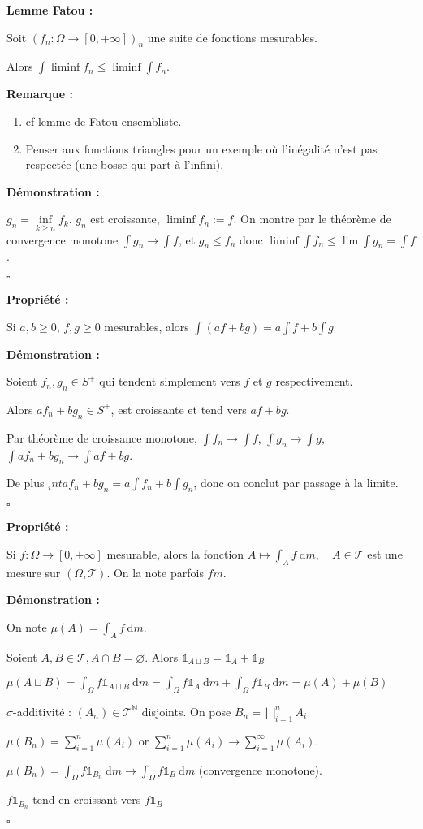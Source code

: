 \documentclass[10pt,a4paper,notitlepage ]{report}
\newcommand{\N}{\mathbb N}
\newcommand{\T}{\mathcal T}
\newcommand{\dd}{\ \mathrm d}
\newcommand{\1}{\mathds 1}
\newcounter{th}
\newenvironment{propriete}[1][]{
	\begin{tcolorbox}
		\textbf{Propriété #1 : }
}
{\end{tcolorbox}}
\newenvironment{demo}[1][]{

	\textbf{Démonstration #1 :}
}{\begin{flushright}
	$\square$
\end{flushright}
}
\newenvironment{lemme}[1][]{
	\begin{tcolorbox}
		\textbf{Lemme #1 : }
	}
	{\end{tcolorbox}}
\newenvironment{rem}{
	
		\textbf{Remarque :}}{}
\begin{document}
\begin{lemme}[Fatou]
	Soit $(f_n : \Omega \rightarrow [0,+\infty])_n$ une suite de fonctions mesurables.
	
	Alors $\int \liminf f_n \le \liminf \int f_n$.
\end{lemme}
\begin{rem}
	\begin{enumerate}
		\item cf lemme de Fatou ensembliste.
		\item Penser aux fonctions triangles pour un exemple où l'inégalité n'est pas respectée (une bosse qui part à l'infini).
	\end{enumerate}
\end{rem}

\begin{demo}
	$g_n = \underset{k\ge n}\inf f_k$. $g_n$ est croissante, $\liminf f_n := f$. On montre par le théorème de convergence monotone $\int g_n \rightarrow \int f$, et $g_n \le f_n$ donc $\liminf \int f_n \le \lim \int g_n = \int f$.
\end{demo}

\begin{propriete}
	Si $a,b \ge 0$, $f,g \ge 0$ mesurables, alors $\int(af+bg) = a\int f + b\int g$
\end{propriete}
\begin{demo}
	Soient $f_n, g_n \in S^+$ qui tendent simplement vers $f$ et $g$ respectivement.
	
	Alors $af_n+bg_n \in S^+$, est croissante et tend vers $af+bg$.
	
	Par théorème de croissance monotone, $\int f_n \rightarrow \int f$, $\int g_n \rightarrow \int g$, $\int af_n+bg_n \rightarrow \int af+bg$.
	
	De plus $_int af_n+bg_n = a\int f_n + b\int g_n$, donc on conclut par passage à la limite.
\end{demo}

\begin{propriete}
	Si $f:\Omega \rightarrow [0,+\infty]$ mesurable, alors la fonction $A \mapsto \int_A f\dd m, \quad A\in \T$ est une mesure sur $(\Omega,\T)$. On la note parfois $fm$.
\end{propriete}
\begin{demo}
	On note $\mu(A) = \int_A f\dd m$.
	
	Soient $A,B\in \T, A\cap B = \varnothing$. Alors $\mathds 1_{A\sqcup B} = \mathds 1_A + \mathds 1_B$
	
	$\mu(A\sqcup B) = \int_\Omega f\mathds 1_{A\sqcup B} \dd m = \int_\Omega f \mathds 1_A \dd m + \int_\Omega f \mathds 1_B \dd m = \mu(A)+\mu(B)$


$\sigma$-additivité : $(A_n) \in \T^\N$ disjoints. On pose $B_n = \bigsqcup_{i=1}^n A_i$

$\mu(B_n)=\sum_{i=1}^n \mu(A_i)$ or $\sum_{i=1}^n \mu(A_i) \rightarrow \sum_{i=1}^\infty \mu(A_i)$.

$\mu(B_n) = \int_\Omega f \1_{B_n} \dd m \rightarrow \int_\Omega f \1_B \dd m$ (convergence monotone).

$f\1_{B_n}$ tend en croissant vers $f\1_B$
\end{demo}
\end{document}
